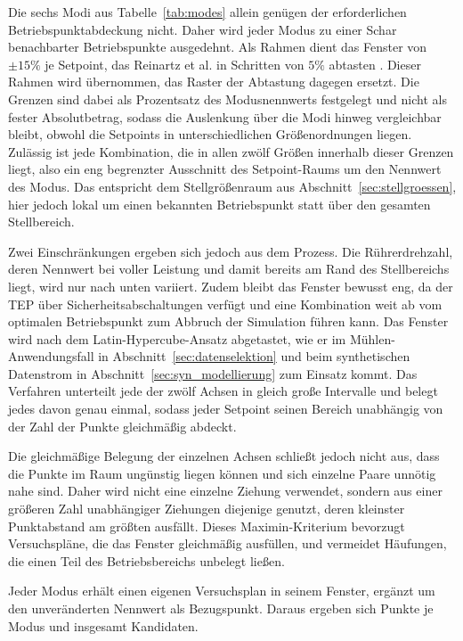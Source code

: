%
Die sechs Modi aus Tabelle~\ref{tab:modes} allein genügen der erforderlichen Betriebspunktabdeckung nicht. Daher wird jeder Modus zu einer Schar benachbarter Betriebspunkte ausgedehnt. Als Rahmen dient das Fenster von $±15\%$ je Setpoint, das Reinartz et al. in Schritten von $5 \%$ abtasten \cite{reinartz.2021}. Dieser Rahmen wird übernommen, das Raster der Abtastung dagegen ersetzt. Die Grenzen sind dabei als Prozentsatz des Modusnennwerts festgelegt und nicht als fester Absolutbetrag, sodass die Auslenkung über die Modi hinweg vergleichbar bleibt, obwohl die Setpoints in unterschiedlichen Größenordnungen liegen. Zulässig ist jede Kombination, die in allen zwölf Größen innerhalb dieser Grenzen liegt, also ein eng begrenzter Ausschnitt des Setpoint-Raums um den Nennwert des Modus. Das entspricht dem Stellgrößenraum aus Abschnitt~\ref{sec:stellgroessen}, hier jedoch lokal um einen bekannten Betriebspunkt statt über den gesamten Stellbereich. \par
%
Zwei Einschränkungen ergeben sich jedoch aus dem Prozess. Die Rührerdrehzahl, deren Nennwert bei voller Leistung und damit bereits am Rand des Stellbereichs liegt, wird nur nach unten variiert. Zudem bleibt das Fenster bewusst eng, da der \ac{TEP} über Sicherheitsabschaltungen verfügt und eine Kombination weit ab vom optimalen Betriebspunkt zum Abbruch der Simulation führen kann.
Das Fenster wird nach dem Latin-Hypercube-Ansatz abgetastet, wie er im Mühlen-Anwendungsfall in Abschnitt~\ref{sec:datenselektion} und beim synthetischen Datenstrom in Abschnitt~\ref{sec:syn_modellierung} zum Einsatz kommt. Das Verfahren unterteilt jede der zwölf Achsen in gleich große Intervalle und belegt jedes davon genau einmal, sodass jeder Setpoint seinen Bereich unabhängig von der Zahl der Punkte gleichmäßig abdeckt. \par
%
Die gleichmäßige Belegung der einzelnen Achsen schließt jedoch nicht aus, dass die Punkte im Raum ungünstig liegen können und sich einzelne Paare unnötig nahe sind. Daher wird nicht eine einzelne Ziehung verwendet, sondern aus einer größeren Zahl unabhängiger Ziehungen diejenige genutzt, deren kleinster Punktabstand am größten ausfällt. Dieses Maximin-Kriterium bevorzugt Versuchspläne, die das Fenster gleichmäßig ausfüllen, und vermeidet Häufungen, die einen Teil des Betriebsbereichs unbelegt ließen. \par
%
Jeder Modus erhält einen eigenen Versuchsplan in seinem Fenster, ergänzt um den unveränderten Nennwert als Bezugspunkt. Daraus ergeben sich \paramPointsPerMode{} Punkte je Modus und insgesamt \paramCandidates{} Kandidaten.
